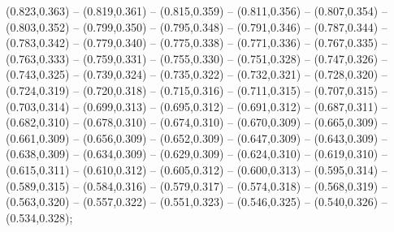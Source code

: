 (0.823,0.363) -- (0.819,0.361) -- (0.815,0.359) -- (0.811,0.356) -- (0.807,0.354) -- (0.803,0.352) -- (0.799,0.350) -- (0.795,0.348) -- (0.791,0.346) -- (0.787,0.344) -- (0.783,0.342) -- (0.779,0.340) -- (0.775,0.338) -- (0.771,0.336) -- (0.767,0.335) -- (0.763,0.333) -- (0.759,0.331) -- (0.755,0.330) -- (0.751,0.328) -- (0.747,0.326) -- (0.743,0.325) -- (0.739,0.324) -- (0.735,0.322) -- (0.732,0.321) -- (0.728,0.320) -- (0.724,0.319) -- (0.720,0.318) -- (0.715,0.316) -- (0.711,0.315) -- (0.707,0.315) -- (0.703,0.314) -- (0.699,0.313) -- (0.695,0.312) -- (0.691,0.312) -- (0.687,0.311) -- (0.682,0.310) -- (0.678,0.310) -- (0.674,0.310) -- (0.670,0.309) -- (0.665,0.309) -- (0.661,0.309) -- (0.656,0.309) -- (0.652,0.309) -- (0.647,0.309) -- (0.643,0.309) -- (0.638,0.309) -- (0.634,0.309) -- (0.629,0.309) -- (0.624,0.310) -- (0.619,0.310) -- (0.615,0.311) -- (0.610,0.312) -- (0.605,0.312) -- (0.600,0.313) -- (0.595,0.314) -- (0.589,0.315) -- (0.584,0.316) -- (0.579,0.317) -- (0.574,0.318) -- (0.568,0.319) -- (0.563,0.320) -- (0.557,0.322) -- (0.551,0.323) -- (0.546,0.325) -- (0.540,0.326) -- (0.534,0.328);
